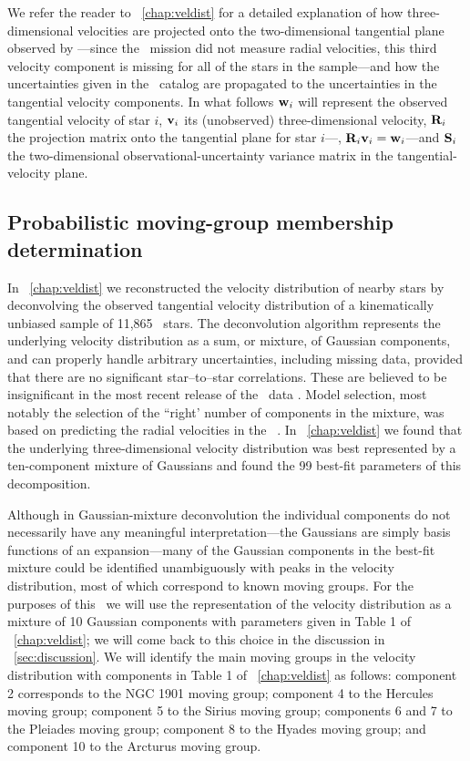 We refer the reader to \chaptername~\ref{chap:veldist} for a detailed
explanation of how three-dimensional velocities are projected onto the
two-dimensional tangential plane observed by
\Hipparcos---since the \Hipparcos\ mission did not measure radial
velocities, this third velocity component is missing for all of the
stars in the sample---and how the uncertainties given in the
\Hipparcos\ catalog are propagated to the uncertainties in the
tangential velocity components. In what follows $\mathbf{w}_i$ will represent
the observed tangential velocity of star $i$, $\boldsymbol{\mathbf{v}}_i$ its (unobserved)
three-dimensional velocity, $\mathbf{R}_i$ the projection matrix onto the
tangential plane for star $i$---\ie, $\mathbf{R}_i \boldsymbol{\mathbf{v}}_i = \mathbf{w}_i$---and $\mathbf{S}_i$
the two-dimensional observational-uncertainty variance matrix in the
tangential-velocity plane.



\subsection{Probabilistic moving-group membership determination}\label{sec:member}

In \chaptername~\ref{chap:veldist} we reconstructed the velocity
distribution of nearby stars by deconvolving the observed tangential
velocity distribution of a kinematically unbiased sample of
11,865 \Hipparcos\ stars. The deconvolution algorithm \citep{BovyXD}
represents the underlying velocity distribution as a sum, or mixture,
of Gaussian components, and can properly handle arbitrary
uncertainties, including missing data, provided that there are no
significant star--to--star correlations. These are believed to be
insignificant in the most recent release of the \Hipparcos\
data \citep{2007ASSL..250.....V}. Model selection, most notably the
selection of the ``right' number of components in the mixture, was
based on predicting the radial velocities in
the \gcs\ \citep[\gcsabb;][]{2004A&A...418..989N}. In \chaptername~\ref{chap:veldist}
we found that the underlying three-dimensional velocity distribution
was best represented by a ten-component mixture of Gaussians and found
the 99 best-fit parameters of this decomposition.

Although in Gaussian-mixture deconvolution the individual components
do not necessarily have any meaningful interpretation---the Gaussians
are simply basis functions of an expansion---many of the Gaussian
components in the best-fit mixture could be identified unambiguously
with peaks in the velocity distribution, most of which correspond to
known moving groups. For the purposes of this \chaptername\ we will
use the representation of the velocity distribution as a mixture of 10
Gaussian components with parameters given in Table 1
of \chaptername~\ref{chap:veldist}; we will come back to this choice
in the discussion in
\sectionname~\ref{sec:discussion}. We will identify the main moving
groups in the velocity distribution with components in Table 1 of
\chaptername~\ref{chap:veldist} as follows: component 2 corresponds to the NGC 1901 moving
group; component 4 to the Hercules moving group; component 5 to the
Sirius moving group; components 6 and 7 to the Pleiades moving group;
component 8 to the Hyades moving group; and component 10 to the
Arcturus moving group.

